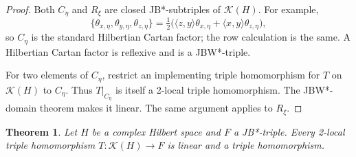 \documentclass[11pt]{article}
\newtheorem{theorem}{Theorem}[section]
\theoremstyle{remark}
\newcommand{\K}{\mathcal K}
\begin{document}
\begin{proof}
Both $C_\eta$ and $R_\xi$ are closed JB*-subtriples of $\K(H)$.  For example,
\[
 \{\theta_{x,\eta},\theta_{y,\eta},\theta_{z,\eta}\}
 =\tfrac12\bigl(\langle z,y\rangle\theta_{x,\eta}
                 +\langle x,y\rangle\theta_{z,\eta}\bigr),
\]
so $C_\eta$ is the standard Hilbertian Cartan factor; the row calculation is
the same.  A Hilbertian Cartan factor is reflexive and is a JBW*-triple.

For two elements of $C_\eta$, restrict an implementing triple homomorphism
for $T$ on $\K(H)$ to $C_\eta$.  Thus $T|_{C_\eta}$ is itself a 2-local
triple homomorphism.  The JBW*-domain theorem
\cite[Theorem 3.8]{BurgosEtAl} makes it linear.  The same argument applies to
$R_\xi$.
\end{proof}

\begin{theorem}\label{thm:elementary}
Let $H$ be a complex Hilbert space and $F$ a JB*-triple.  Every 2-local triple
homomorphism $T:\K(H)\to F$ is linear and a triple homomorphism.
\end{theorem}
\end{document}
